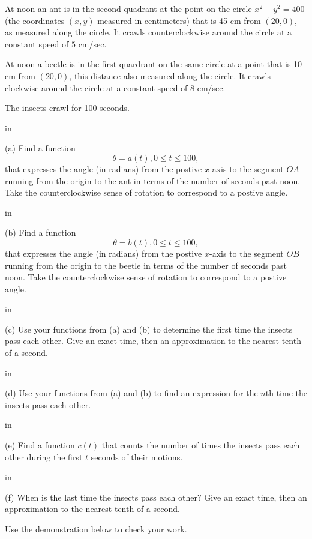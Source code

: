 \documentclass{ximera}
\newcommand{\pskip}{\vskip 0.1 in}
\begin{document}
\begin{example} \label{Ex1:Angles}
At noon an ant is in the second quadrant at the point on the circle $x^2+y^2=400$ (the coordinates $(x,y)$ measured in centimeters) that is 45 cm from $(20,0)$, as measured along the circle. It crawls counterclockwise around the circle at a constant speed of $5$ cm/sec.

At noon a beetle is in the first quardrant on the same circle at a point that is 10 cm from $(20,0)$, this distance also measured along the circle. It crawls clockwise around the circle at a constant speed of $8$ cm/sec.

The insects crawl for 100 seconds.

\pskip

(a) Find a function
\[
    \theta = a(t) , 0\leq t \leq 100,
\]
that expresses the angle (in radians) from the postive $x$-axis to the segment $OA$ running from the origin to the ant in terms of the number of seconds past noon. Take the counterclockwise sense of rotation to correspond to a postive angle.

\pskip

(b) Find a function
\[
    \theta = b(t) , 0\leq t \leq 100,
\]
that expresses the angle (in radians) from the postive $x$-axis to the segment $OB$ running from the origin to the beetle in terms of the number of seconds past noon. Take the counterclockwise sense of rotation to correspond to a postive angle.

\pskip


(c) Use your functions from (a) and (b) to determine the first time the insects pass each other. Give an exact time, then an approximation to the nearest tenth of a second.

\pskip

(d) Use your functions from (a) and (b) to find an expression for the $n$th time the insects pass each other. 

\pskip

(e) Find a function $c(t)$ that counts the number of times the insects pass each other during the first $t$ seconds of their motions.

\pskip

(f) When is the last time the insects pass each other? Give an exact time, then an approximation to the nearest tenth of a second.

\begin{exploration}\label{exp:angles2}
Use the demonstration below to check your work.


 
\begin{onlineOnly}
    \begin{center}
\end{center}
\end{onlineOnly}
\end{exploration}


\end{example}
\end{document}
